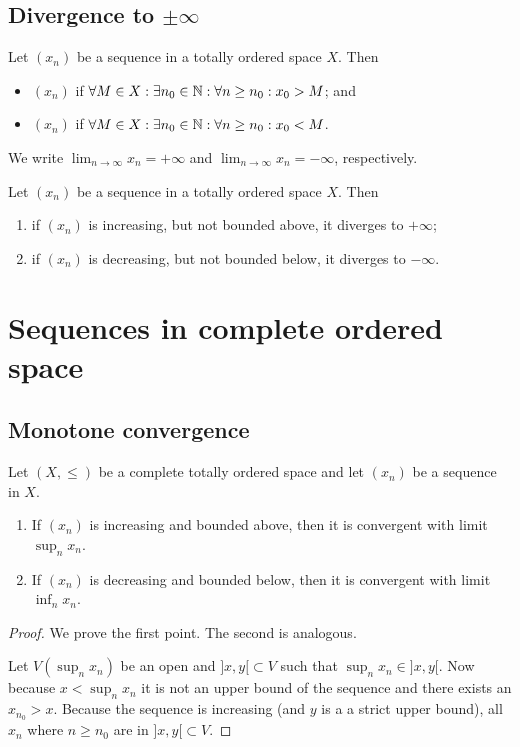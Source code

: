 \subsection{Divergence to $\pm\infty$}
\begin{definition}
Let $(x_n)$ be a sequence in a totally ordered space $X$. Then
\begin{itemize}
\item $(x_n)$  if $\forall M\in X: \exists n_0\in\mathbb{N}: \forall n\geq n_0: x_0 > M$; and
\item $(x_n)$  if $\forall M\in X: \exists n_0\in\mathbb{N}: \forall n\geq n_0: x_0 < M$.
\end{itemize}
We write $\lim_{n\to\infty}x_n = +\infty$ and $\lim_{n\to\infty}x_n = -\infty$, respectively.
\end{definition}

\begin{lemma}
Let $(x_n)$ be a sequence in a totally ordered space $X$. Then
\begin{enumerate}
\item if $(x_n)$ is increasing, but not bounded above, it diverges to $+\infty$;
\item if $(x_n)$ is decreasing, but not bounded below, it diverges to $-\infty$.
\end{enumerate}
\end{lemma}

\section{Sequences in complete ordered space}
\subsection{Monotone convergence}
\begin{proposition} \label{sequenceMonotoneConvergence}
Let $(X,\leq)$ be a complete totally ordered space and let $(x_n)$ be a sequence in $X$.
\begin{enumerate}
\item If $(x_n)$ is increasing and bounded above, then it is convergent with limit $\sup_n x_n$.
\item If $(x_n)$ is decreasing and bounded below, then it is convergent with limit $\inf_n x_n$.
\end{enumerate}
\end{proposition}
\begin{proof}
We prove the first point. The second is analogous.

Let $V(\sup_n x_n)$ be an open and $]x,y[\subset V$ such that $\sup_n x_n \in ]x,y[$. Now because $x<\sup_n x_n$ it is not an upper bound of the sequence and there exists an $x_{n_0}> x$. Because the sequence is increasing (and $y$ is a a strict upper bound), all $x_n$ where $n\geq n_0$ are in $]x,y[\subset V$.
\end{proof}

